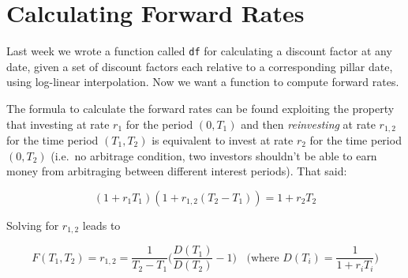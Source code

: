 \section{Calculating Forward Rates}\label{calculating-forward-rates}

Last week we wrote a function called \texttt{df} for calculating a
discount factor at any date, given a set of discount factors each
relative to a corresponding pillar date, using log-linear interpolation.
Now we want a function to compute forward rates.

The formula to calculate the forward rates can be found exploiting the
property that investing at rate \(r_1\) for the period \((0, T_1)\) and
then \emph{reinvesting} at rate \(r_{1,2}\) for the time period
\((T_1, T_2)\) is equivalent to invest at rate \(r_2\) for the time
period \((0, T_2)\) (i.e.~no arbitrage condition, two investors
shouldn't be able to earn money from arbitraging between different
interest periods). That said:

\[(1+r_1 T_1)(1+r_{1,2}(T_2 - T_1)) = 1 + r_2 T_2\]

Solving for \(r_{1,2}\) leads to

\[F(T_1, T_2) = r_{1,2} = \frac{1}{T_2-T_1}\Big(\frac{D(T_1)}{D(T_2)} - 1 \Big)~~~~\textrm{(where $D{(T_i)}=\frac{1}{1+r_iT_{i}}$)}\]

